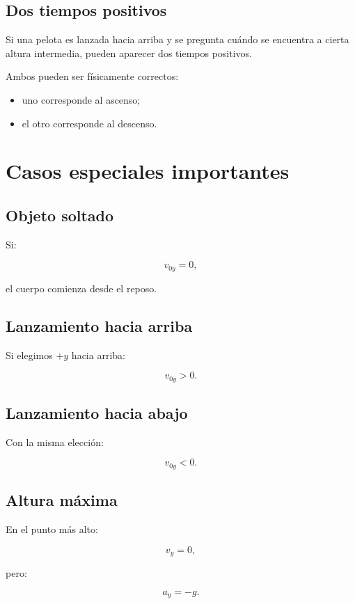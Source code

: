 \subsection{Dos tiempos positivos}

Si una pelota es lanzada hacia arriba y se pregunta cuándo se encuentra a cierta altura intermedia, pueden aparecer dos tiempos positivos.

Ambos pueden ser físicamente correctos:

\begin{itemize}
    \item uno corresponde al ascenso;
    \item el otro corresponde al descenso.
\end{itemize}


\section{Casos especiales importantes}

\subsection{Objeto soltado}

Si:

\[ v_{0y}=0, \]

el cuerpo comienza desde el reposo.


\subsection{Lanzamiento hacia arriba}

Si elegimos \(+y\) hacia arriba:

\[ v_{0y}>0. \]


\subsection{Lanzamiento hacia abajo}

Con la misma elección:

\[ v_{0y}<0. \]


\subsection{Altura máxima}

En el punto más alto:

\[ v_y=0, \]

pero:

\[ a_y=-g. \]


